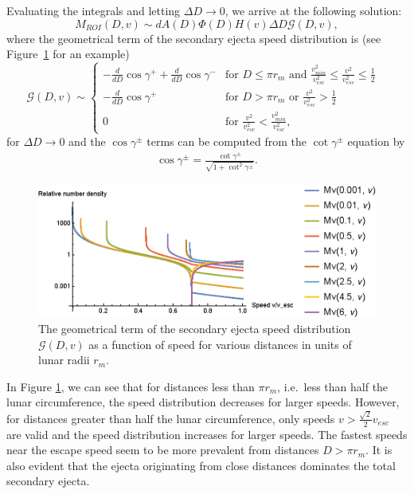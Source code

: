 \documentclass{hitec}
\numberwithin{equation}{section}
\begin{document}
Evaluating the integrals and letting $\Delta D \to 0$, we arrive at the following solution:
\begin{equation}
M_{ROI}(D,v) \sim dA(D)\Phi(D)H(v)\Delta D \mathcal{G}(D,v),
\end{equation}
where the geometrical term of the secondary ejecta speed distribution is (see Figure~\ref{fig:speed_dist} for an example)
\begin{equation}
\mathcal{G}(D,v) \sim
\begin{cases}
-\frac{d}{dD}\cos\gamma^+ + \frac{d}{dD}\cos\gamma^- &\text{for $D \le \pi r_m$ and $\frac{v_{min}^2}{v_{esc}^2} \le \frac{v^2}{v_{esc}^2} \le \frac{1}{2}$ }\\
-\frac{d}{dD}\cos\gamma^+ & \text{for $D > \pi r_m $ or $\frac{v^2}{v_{esc}^2} > \frac{1}{2}$}\\
0 & \text{for $\frac{v^2}{v_{esc}^2} < \frac{v_{min}^2}{v_{esc}^2}$},
\end{cases}
\end{equation}
for $\Delta D\to 0$ and the $\cos\gamma^\pm$ terms can be computed from the $\cot\gamma^\pm$ equation by
\begin{eqnarray}
\cos\gamma^\pm = \frac{\cot\gamma^\pm}{\sqrt{1 + \cot^2\gamma^\pm}}.
\end{eqnarray}

\begin{figure}[h!]
	\centering
	\includegraphics[width=1\textwidth]{speed_dist.eps}
	\caption{The geometrical term of the secondary ejecta speed distribution $\mathcal{G}(D,v)$ as a function of speed for various distances in units of lunar radii $r_m$.}\label{fig:speed_dist}
\end{figure}

In Figure \ref{fig:speed_dist}, we can see that for distances less than $\pi r_m$, i.e.\ less than half the lunar circumference, the speed distribution decreases for larger speeds. However, for distances greater than half the lunar circumference, only speeds $v > \frac{\sqrt{2}}{2}v_{esc}$ are valid and the speed distribution increases for larger speeds. The fastest speeds near the escape speed seem to be more prevalent from distances $D > \pi r_m$. It is also evident that the ejecta originating from close distances dominates the total secondary ejecta.
\end{document}
